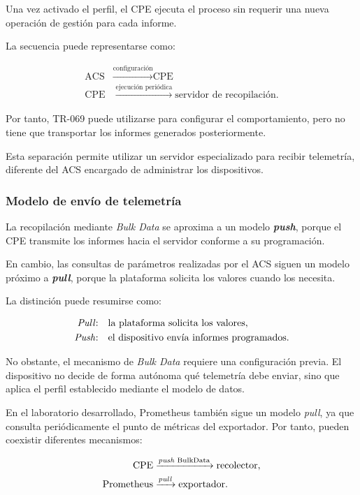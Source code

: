 Una vez activado el perfil, el CPE ejecuta el proceso sin requerir una
nueva operación de gestión para cada informe.

La secuencia puede representarse como:

\[
\begin{aligned}
    \text{ACS}
    &\xrightarrow{\text{configuración}}
    \text{CPE}\\
    \text{CPE}
    &\xrightarrow{\text{ejecución periódica}}
    \text{servidor de recopilación}.
\end{aligned}
\]

Por tanto, TR-069 puede utilizarse para configurar el comportamiento,
pero no tiene que transportar los informes generados posteriormente.

Esta separación permite utilizar un servidor especializado para recibir
telemetría, diferente del ACS encargado de administrar los dispositivos.


\subsubsection*{Modelo de envío de telemetría}

La recopilación mediante \textit{Bulk Data} se aproxima a un modelo
\textbf{\textit{push}}, porque el CPE transmite los informes hacia el
servidor conforme a su programación.

En cambio, las consultas de parámetros realizadas por el ACS siguen un
modelo próximo a \textbf{\textit{pull}}, porque la plataforma solicita
los valores cuando los necesita.

La distinción puede resumirse como:

\[
\begin{aligned}
    \text{\textit{Pull}:}\quad&
    \text{la plataforma solicita los valores},\\
    \text{\textit{Push}:}\quad&
    \text{el dispositivo envía informes programados}.
\end{aligned}
\]

No obstante, el mecanismo de \textit{Bulk Data} requiere una
configuración previa. El dispositivo no decide de forma autónoma qué
telemetría debe enviar, sino que aplica el perfil establecido mediante el
modelo de datos.

En el laboratorio desarrollado, Prometheus también sigue un modelo
\textit{pull}, ya que consulta periódicamente el punto de métricas del
exportador. Por tanto, pueden coexistir diferentes mecanismos:

\[
\begin{aligned}
    \text{CPE}
    &\xrightarrow{\text{\textit{push} BulkData}}
    \text{recolector},\\
    \text{Prometheus}
    &\xrightarrow{\text{\textit{pull}}}
    \text{exportador}.
\end{aligned}
\]


